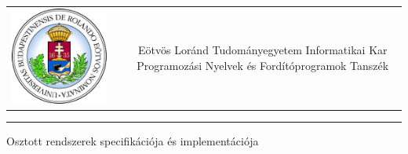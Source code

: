 \documentclass[12pt]{article}
\begin{document}
	
	

\begin{titlepage}
	\vspace*{0cm}
	\centering
	\begin{tabular}{cp{1cm}c}
		\begin{minipage}{4cm}
			\vspace{0pt}
			\includegraphics[width=1\textwidth]{elte_cimer}
		\end{minipage} & &
		\begin{minipage}{7cm}
			\vspace{0pt}Eötvös Loránd Tudományegyetem \vspace{10pt} \newline
			Informatikai Kar \vspace{10pt} \newline
			Programozási Nyelvek és Fordítóprogramok Tanszék
		\end{minipage}
	\end{tabular}
	
	\vspace*{0.2cm}
	\rule{\textwidth}{1pt}
	
	\vspace*{3cm}
	{\Huge Osztott rendszerek specifikációja és implementációja }
	

\end{titlepage}
\end{document}
